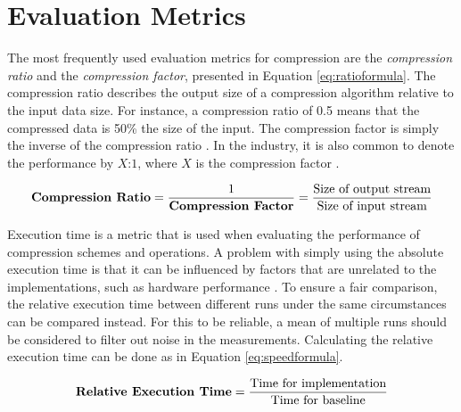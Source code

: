 \section{Evaluation Metrics}

The most frequently used evaluation metrics for compression are the \textit{compression ratio} and the \textit{compression factor}, presented in Equation \ref{eq:ratioformula}. The compression ratio describes the output size of a compression algorithm relative to the input data size. For instance, a compression ratio of 0.5 means that the compressed data is 50\% the size of the input. The compression factor is simply the inverse of the compression ratio \cite{metric}. In the industry, it is also common to denote the performance by \(X\):\(1\), where \(X\) is the compression factor \cite{ratioIBM}.

\begin{equation}
    \textrm{\textbf{Compression Ratio}}=\frac{\textrm{1}}
    {\textrm{\textbf{Compression Factor}}}=\frac{\textrm{Size of output stream}}
    {\textrm{Size of input stream}}
    \label{eq:ratioformula}
\end{equation}


Execution time is a metric that is used when evaluating the performance of compression schemes and operations. A problem with simply using the absolute execution time is that it can be influenced by factors that are unrelated to the implementations, such as hardware performance \cite{metric}. To ensure a fair comparison, the relative execution time between different runs under the same circumstances can be compared instead. For this to be reliable, a mean of multiple runs should be considered to filter out noise in the measurements.
Calculating the relative execution time can be done as in Equation \ref{eq:speedformula}.



\begin{equation}
    \textrm{\textbf{Relative Execution Time}}=\frac{\textrm{Time for implementation}}{\textrm{Time for baseline}}
    \label{eq:speedformula}
\end{equation}





